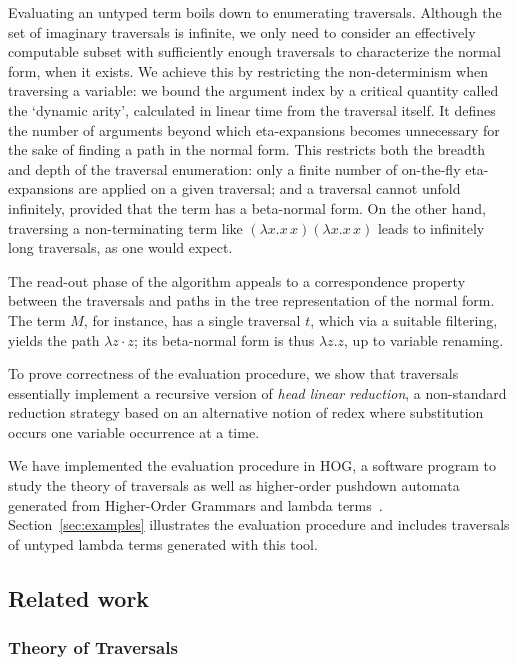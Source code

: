 \documentclass{elsarticle}
\theoremstyle{plain}
\theoremstyle{definition}
\theoremstyle{remark}
\begin{document}
Evaluating an untyped term boils down to enumerating traversals.
 Although the set of imaginary traversals is infinite, we only need to consider an effectively computable subset with sufficiently enough traversals to characterize the normal form, when it exists.
We achieve this by restricting the non-determinism when traversing a variable: we bound the argument index by a critical quantity called the `dynamic arity', calculated in linear time from the traversal itself. It defines the number of arguments beyond which eta-expansions becomes unnecessary for the sake of finding a path in the normal form. This restricts both the breadth and depth of the traversal enumeration: only a finite number of on-the-fly eta-expansions are applied on a given traversal; and a traversal cannot unfold infinitely, provided that the term has a beta-normal form.
On the other hand, traversing a non-terminating term like $(\lambda x. x\,x)(\lambda x. x\,x)$ leads to infinitely long traversals, as one would expect.

The read-out phase of the algorithm appeals to a correspondence property between the traversals and paths in the tree representation of the normal form. The term $M$, for instance, has a single traversal $t$, which via a suitable filtering, yields the path $\lambda z \cdot z$; its beta-normal form is thus $\lambda z. z$, up to variable renaming.

 To prove correctness of the evaluation procedure, we show that traversals essentially implement a recursive version of \emph{head linear reduction}, a non-standard reduction strategy based on an alternative notion of redex
  where substitution occurs one variable occurrence at a time.

 We have implemented the evaluation procedure in HOG, a software program to study the theory of traversals as well as higher-order pushdown automata generated from Higher-Order Grammars and lambda terms~\cite{BlumGalop2008,Blum-HogTool}.  Section~\ref{sec:examples} illustrates the evaluation procedure and includes traversals of untyped lambda terms generated with this tool.

\subsection{Related work}

\subsubsection{Theory of Traversals}
\end{document}
